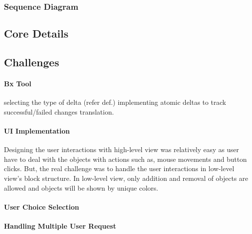 \subsubsection{Sequence Diagram}\label{subsubsec:sequence}

\subsection{Core Details}\label{subsec:coredetails}

\subsection{Challenges}\label{subsec:implchallenges}
\paragraph{Bx Tool}
selecting the type of delta (refer def.)
implementing atomic deltas to track successful/failed changes translation. 

\paragraph{UI Implementation}
Designing the user interactions with high-level view was relatively easy as user have to deal with the objects with actions such as, mouse movements and button clicks. But, the real challenge was to handle the user interactions in low-level view's block structure. In low-level view, only addition and removal of objects are allowed and objects will be shown by unique colors. 

\paragraph{User Choice Selection}

\paragraph{Handling Multiple User Request}
 



